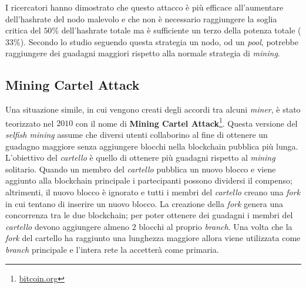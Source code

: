 I ricercatori hanno dimostrato che questo attacco è più efficace all'aumentare dell'hashrate del nodo malevolo e che non è necessario raggiungere la soglia critica del $50\%$ dell'hashrate totale ma è sufficiente un terzo della potenza totale ($33\%$). Secondo lo studio seguendo questa strategia un nodo, od un \textit{pool}, potrebbe raggiungere dei guadagni maggiori rispetto alla normale strategia di \textit{mining}.

\subsection{Mining Cartel Attack}
Una situazione simile, in cui vengono creati degli accordi tra alcuni \textit{miner}, è stato teorizzato nel $2010$ con il nome di \textbf{Mining Cartel Attack}\footnote{\href{https://web.archive.org/web/20101222041256/http://www.bitcoin.org/smf/index.php?topic=2227.0}{bitcoin.org}}. Questa versione del \textit{selfish mining} assume che diversi utenti collaborino al fine di ottenere un guadagno maggiore senza aggiungere blocchi nella blockchain pubblica più lunga. L'obiettivo del \textit{cartello} è quello di ottenere più guadagni rispetto al \textit{mining} solitario. Quando un membro del \textit{cartello} pubblica un nuovo blocco e viene aggiunto alla blockchain principale i partecipanti possono dividersi il compenso; altrimenti, il nuovo blocco è ignorato e tutti i membri del \textit{cartello} creano una \textit{fork} in cui tentano di inserire un nuovo blocco. La creazione della \textit{fork} genera una concorrenza tra le due blockchain; per poter ottenere dei guadagni i membri del \textit{cartello} devono aggiungere almeno $2$ blocchi al proprio \textit{branch}. Una volta che la \textit{fork} del cartello ha raggiunto una lunghezza maggiore allora viene utilizzata come \textit{branch} principale e l'intera rete la accetterà come primaria.

